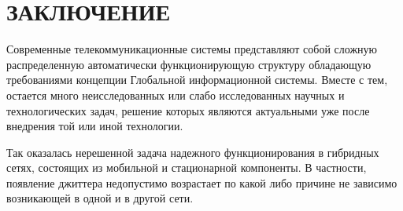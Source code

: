 \chapter*{ЗАКЛЮЧЕНИЕ}
Современные телекоммуникационные системы представляют собой сложную распределенную автоматически функционирующую структуру обладающую требованиями концепции Глобальной информационной системы.
Вместе с тем, остается много неисследованных или слабо исследованных научных и технологических задач, решение которых являются актуальными уже после внедрения той или иной технологии.

Так оказалась нерешенной задача надежного функционирования в гибридных сетях, состоящих из мобильной и стационарной компоненты.
В частности, появление джиттера недопустимо возрастает по какой либо причине не зависимо возникающей в одной и в другой сети.

